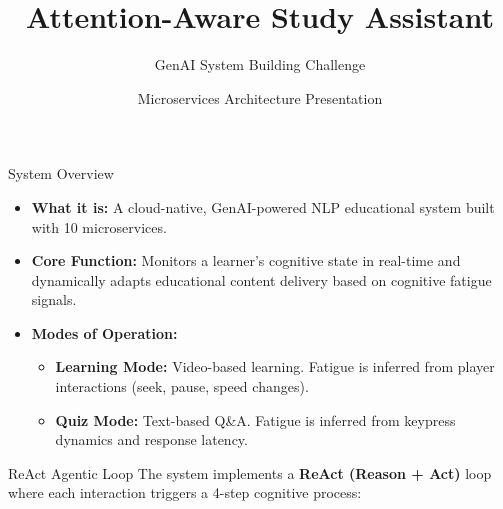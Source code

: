 \documentclass[aspectratio=169]{beamer}
\title{\textbf{Attention-Aware Study Assistant}}
\subtitle{GenAI System Building Challenge}
\author{Microservices Architecture Presentation}
\date{}
\begin{document}
\begin{frame}
    \titlepage
\end{frame}

\begin{frame}{System Overview}
    \begin{itemize}
        \item \textbf{What it is:} A cloud-native, GenAI-powered NLP educational system built with 10 microservices.
        \item \textbf{Core Function:} Monitors a learner's cognitive state in real-time and dynamically adapts educational content delivery based on cognitive fatigue signals.
        \item \textbf{Modes of Operation:}
        \begin{itemize}
            \item \textbf{Learning Mode:} Video-based learning. Fatigue is inferred from player interactions (seek, pause, speed changes).
            \item \textbf{Quiz Mode:} Text-based Q\&A. Fatigue is inferred from keypress dynamics and response latency.
        \end{itemize}
    \end{itemize}
\end{frame}

\begin{frame}{ReAct Agentic Loop}
    The system implements a \textbf{ReAct (Reason + Act)} loop where each interaction triggers a 4-step cognitive process:
    \vspace{0.3cm}
    \begin{center}
    \end{center}
\end{frame}
\end{document}
